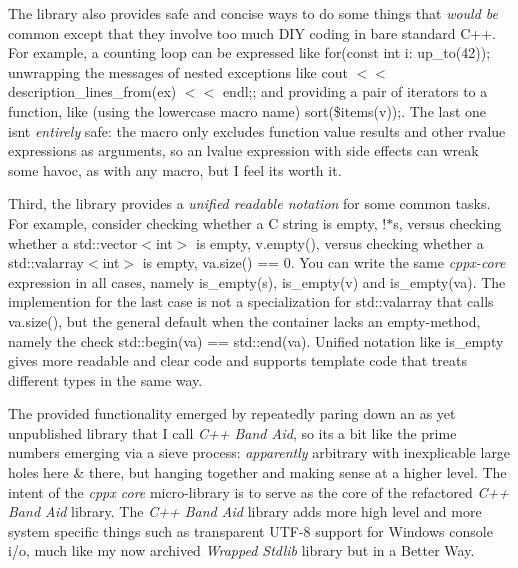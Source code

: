 The library also provides safe and concise ways to do some things that {\itshape would be} common except that they involve too much D\+IY coding in bare standard C++. For example, a counting loop can be expressed like {\ttfamily for(const int i\+: up\+\_\+to(42))}; unwrapping the messages of nested exceptions like {\ttfamily cout $<$$<$ description\+\_\+lines\+\_\+from(ex) $<$$<$ endl;}; and providing a pair of iterators to a function, like (using the lowercase macro name) {\ttfamily sort(\$items(v));}. The last one isn\textquotesingle{}t {\itshape entirely} safe\+: the macro only excludes function value results and other rvalue expressions as arguments, so an lvalue expression with side effects can wreak some havoc, as with any macro, but I feel it\textquotesingle{}s worth it.

Third, the library provides a {\itshape unified readable notation} for some common tasks. For example, consider checking whether a C string is empty, {\ttfamily !$\ast$s}, versus checking whether a {\ttfamily std\+::vector$<$int$>$} is empty, {\ttfamily v.\+empty()}, versus checking whether a {\ttfamily std\+::valarray$<$int$>$} is empty, {\ttfamily va.\+size() == 0}. You can write the same {\itshape cppx-\/core} expression in all cases, namely {\ttfamily is\+\_\+empty(s)}, {\ttfamily is\+\_\+empty(v)} and {\ttfamily is\+\_\+empty(va)}. The implemention for the last case is not a specialization for {\ttfamily std\+::valarray} that calls {\ttfamily va.\+size()}, but the general default when the container lacks an {\ttfamily empty}-\/method, namely the check {\ttfamily std\+::begin(va) == std\+::end(va)}. Unified notation like {\ttfamily is\+\_\+empty} gives more readable and clear code and supports template code that treats different types in the same way.





The provided functionality emerged by repeatedly paring down an as yet unpublished library that I call {\itshape C++ Band Aid}, so it\textquotesingle{}s a bit like the prime numbers emerging via a sieve process\+: {\itshape apparently} arbitrary with inexplicable large holes here \& there, but hanging together and making sense at a higher level. The intent of the {\itshape cppx core} micro-\/library is to serve as the core of the refactored {\itshape C++ Band Aid} library. The {\itshape C++ Band Aid} library adds more high level and more system specific things such as transparent U\+T\+F-\/8 support for Windows console i/o, much like my now archived {\itshape Wrapped Stdlib} library but in a Better Way\texttrademark{}.

